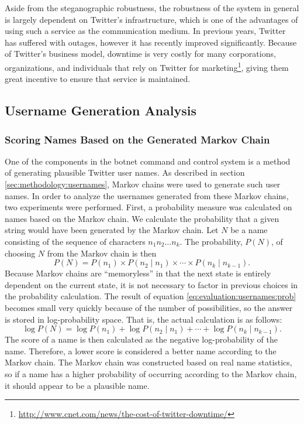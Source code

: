 Aside from the steganographic robustness, the robustness of the system in general
is largely dependent on Twitter's infrastructure,
which is one of the advantages of using such a service as the communication
medium.  In previous years, Twitter has suffered with outages, however it has
recently improved significantly.  Because of Twitter's business model, downtime
is very costly for many corporations, organizations, and individuals that rely
on Twitter for marketing\footnote{\url{http://www.cnet.com/news/the-cost-of-twitter-downtime/}},
giving them great incentive to ensure that service is maintained.

\subsection{Username Generation Analysis}
\label{sec:evaluation:usernames}

\subsubsection{Scoring Names Based on the Generated Markov Chain}
\label{subsec:evaluation:usernames:score-by-Markov}

One of the components in the botnet command and control system is a method
of generating plausible Twitter user names.  As described in section
\ref{sec:methodology:usernames}, Markov chains were used to generate such
user names.  In order to analyze the usernames generated from these Markov
chains, two experiments were performed.  First, a probability measure
was calculated on names based on the Markov chain.  We calculate the probability
that a given string would have been generated by the Markov chain.  Let $N$ be
a name consisting of the sequence of characters $n_1n_2\ldots n_k$.  The
probability, $P(N)$, of choosing $N$ from the Markov chain is then
\begin{equation}
\label{eq:evaluation:usernames:prob}
    P(N) = P(n_1)\times P(n_2 \mid n_1) \times \cdots \times P(n_k \mid n_{k-1})\mbox{.}
\end{equation}
Because Markov chains are ``memoryless'' in that the next state is entirely
dependent on the current state, it is not necessary to factor in previous
choices in the probability calculation.  The result of equation
\ref{eq:evaluation:usernames:prob} becomes small very quickly because of
the number of possibilities, so the answer is stored in log-probability space.
That is, the actual calculation is as follows:
\begin{equation}
    \label{eq:evaluation:usernames:log-prob}
    \log P(N) = \log P(n_1) + \log P(n_2 \mid n_1) + \cdots + \log P(n_k \mid n_{k-1})\mbox{.}
\end{equation}
The score of a name is then calculated as the negative log-probability of the name.
Therefore, a lower score is considered a better name according to the Markov chain.
The Markov chain was constructed based on real name statistics, so if a name
has a higher probability of occurring according to the Markov chain, it should
appear to be a plausible name.

